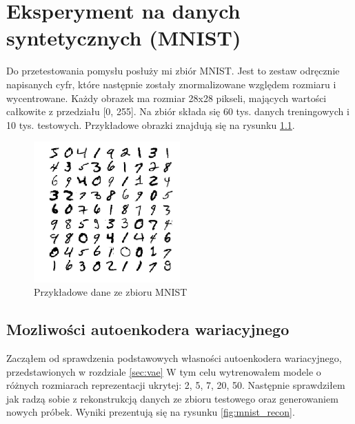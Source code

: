\chapter{Eksperyment na danych syntetycznych (MNIST)}

Do przetestowania pomysłu posłuży mi zbiór MNIST. Jest to zestaw odręcznie napisanych cyfr, które następnie zostały znormalizowane względem rozmiaru i wycentrowane. Każdy obrazek ma rozmiar 28x28 pikseli, mających wartości całkowite z przedziału [0, 255]. Na zbiór składa się 60 tys. danych treningowych i 10 tys. testowych. Przykładowe obrazki znajdują się na rysunku \ref{fig:mnist}.

\begin{figure}[h!]
    \centering
    \includegraphics[width=0.5\textwidth]{images/mnist_v2}
    \caption{Przykładowe dane ze zbioru MNIST}
    \label{fig:mnist}
\end{figure}

\section{Mozliwości autoenkodera wariacyjnego} \label{sec:vae_oppo}

Zacząłem od sprawdzenia podstawowych własności autoenkodera wariacyjnego, przedstawionych w rozdziale \ref{sec:vae} W tym celu wytrenowałem modele o różnych rozmiarach reprezentacji ukrytej: 2, 5, 7, 20, 50. Następnie sprawdziłem jak radzą sobie z rekonstrukcją danych ze zbioru testowego oraz generowaniem nowych próbek. Wyniki prezentują się na rysunku \ref{fig:mnist_recon}. 

